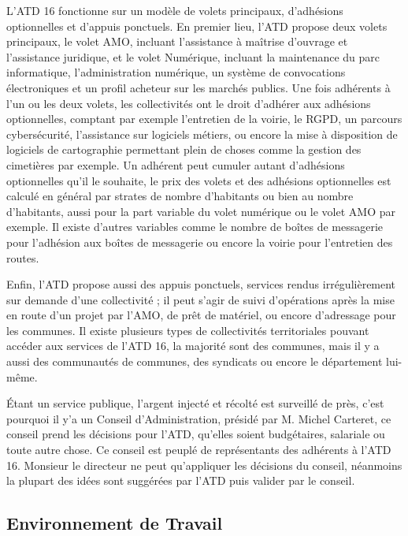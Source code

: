 \documentclass[a4paper,12pt]{report}
\begin{document}
L'ATD 16 fonctionne sur un modèle de volets principaux, d'adhésions optionnelles et d'appuis ponctuels. En premier lieu, l'ATD propose deux volets principaux, le volet AMO, incluant l'assistance à maîtrise d'ouvrage et l'assistance juridique, et le volet Numérique, incluant la maintenance du parc informatique, l'administration numérique, un système de convocations électroniques et un profil acheteur sur les marchés publics. Une fois adhérents à l'un ou les deux volets, les collectivités ont le droit d'adhérer aux adhésions optionnelles, comptant par exemple l'entretien de la voirie, le RGPD, un parcours cybersécurité, l'assistance sur logiciels métiers, ou encore la mise à disposition de logiciels de cartographie permettant plein de choses comme la gestion des cimetières par exemple. Un adhérent peut cumuler autant d'adhésions optionnelles qu'il le souhaite, le prix des volets et des adhésions optionnelles est calculé en général par strates de nombre d'habitants ou bien au nombre d'habitants, aussi pour la part variable du volet numérique ou le volet AMO par exemple. Il existe d'autres variables comme le nombre de boîtes de messagerie pour l'adhésion aux boîtes de messagerie ou encore la voirie pour l'entretien des routes.

Enfin, l'ATD propose aussi des appuis ponctuels, services rendus irrégulièrement sur demande d'une collectivité ; il peut s'agir de suivi d'opérations après la mise en route d'un projet par l'AMO, de prêt de matériel, ou encore d'adressage pour les communes. Il existe plusieurs types de collectivités territoriales pouvant accéder aux services de l'ATD 16, la majorité sont des communes, mais il y a aussi des communautés de communes, des syndicats ou encore le département lui-même.

Étant un service publique, l'argent injecté et récolté est surveillé de près, c'est pourquoi il y'a un Conseil d'Administration, présidé par M. Michel Carteret, ce conseil prend les décisions pour l'ATD, qu'elles soient budgétaires, salariale ou toute autre chose. Ce conseil est peuplé de représentants des adhérents à l'ATD 16. Monsieur le directeur ne peut qu'appliquer les décisions du conseil, néanmoins la plupart des idées sont suggérées par l'ATD puis valider par le conseil.

\subsection{Environnement de Travail}
\end{document}
